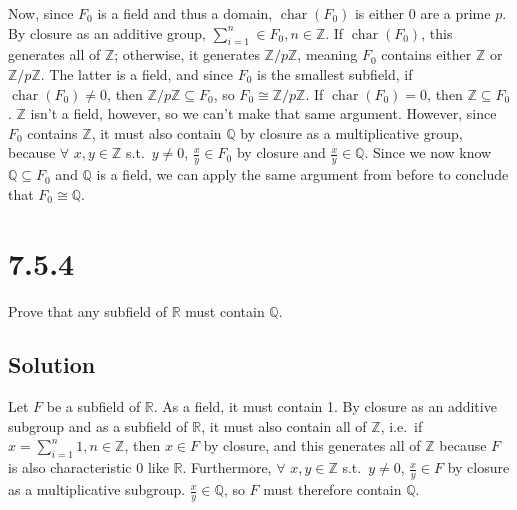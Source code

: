 \documentclass[fleqn]{article}
\DeclareMathOperator{\Char}{char}
\begin{document}
        Now, since $F_0$ is a field and thus a domain, $\Char(F_0)$ is either 0 are a prime $p$.  By closure as an additive group, $\sum\limits_{i = 1}^{n} \in F_0, n \in \mathbb{Z}$.  If $\Char(F_0)$, this generates all of $\mathbb{Z}$; otherwise, it generates $\mathbb{Z}/p\mathbb{Z}$, meaning $F_0$ contains either $\mathbb{Z}$ or $\mathbb{Z}/p\mathbb{Z}$.  The latter is a field, and since $F_0$ is the smallest subfield, if $\Char(F_0) \neq 0$, then $\mathbb{Z}/p\mathbb{Z} \subseteq F_0$, so $F_0 \cong \mathbb{Z}/p\mathbb{Z}$.  If $\Char(F_0) = 0$, then $\mathbb{Z} \subseteq F_0$.  $\mathbb{Z}$ isn't a field, however, so we can't make that same argument.  However, since $F_0$ contains $\mathbb{Z}$, it must also contain $\mathbb{Q}$ by closure as a multiplicative group, because $\forall$ $x, y \in \mathbb{Z}$ s.t.\ $y \neq 0$, $\frac{x}{y} \in F_0$ by closure and $\frac{x}{y} \in \mathbb{Q}$.  Since we now know $\mathbb{Q} \subseteq F_0$ and $\mathbb{Q}$ is a field, we can apply the same argument from before to conclude that $F_0 \cong \mathbb{Q}$.
    
    \section{7.5.4}
    Prove that any subfield of $\mathbb{R}$ must contain $\mathbb{Q}$.
        
        \subsection{Solution}
        Let $F$ be a subfield of $\mathbb{R}$.  As a field, it must contain 1.  By closure as an additive subgroup and as a subfield of $\mathbb{R}$, it must also contain all of $\mathbb{Z}$, i.e.\ if $x = \sum\limits_{i = 1}^{n} 1, n \in \mathbb{Z}$, then $x \in F$ by closure, and this generates all of $\mathbb{Z}$ because $F$ is also characteristic 0 like $\mathbb{R}$.  Furthermore, $\forall$ $x, y \in \mathbb{Z}$ s.t.\ $y \neq 0$, $\frac{x}{y} \in F$ by closure as a multiplicative subgroup.  $\frac{x}{y} \in \mathbb{Q}$, so $F$ must therefore contain $\mathbb{Q}$.
    
\end{document}
